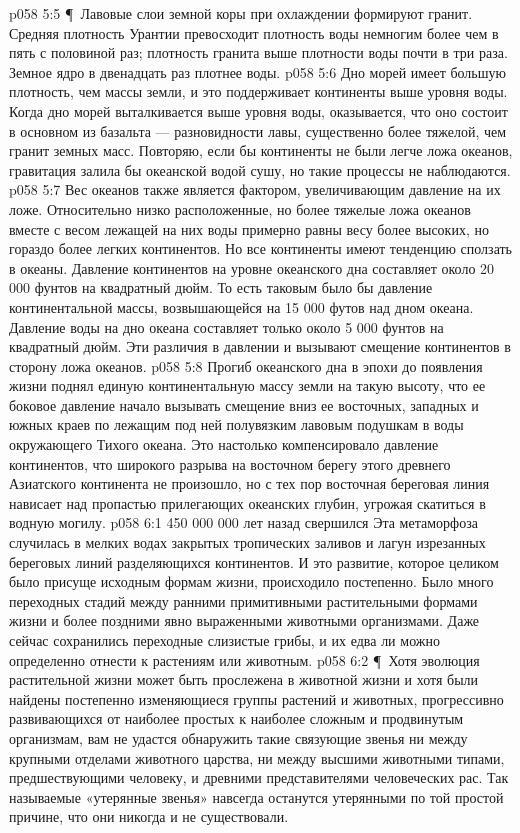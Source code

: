 \vs p058 5:5 \P\ Лавовые слои земной коры при охлаждении формируют гранит. Средняя плотность Урантии превосходит плотность воды немногим более чем в пять с половиной раз; плотность гранита выше плотности воды почти в три раза. Земное ядро в двенадцать раз плотнее воды.
\vs p058 5:6 Дно морей имеет большую плотность, чем массы земли, и это поддерживает континенты выше уровня воды. Когда дно морей выталкивается выше уровня воды, оказывается, что оно состоит в основном из базальта --- разновидности лавы, существенно более тяжелой, чем гранит земных масс. Повторяю, если бы континенты не были легче ложа океанов, гравитация залила бы океанской водой сушу, но такие процессы не наблюдаются.
\vs p058 5:7 Вес океанов также является фактором, увеличивающим давление на их ложе. Относительно низко расположенные, но более тяжелые ложа океанов вместе с весом лежащей на них воды примерно равны весу более высоких, но гораздо более легких континентов. Но все континенты имеют тенденцию сползать в океаны. Давление континентов на уровне океанского дна составляет около 20 000 фунтов на квадратный дюйм. То есть таковым было бы давление континентальной массы, возвышающейся на 15 000 футов над дном океана. Давление воды на дно океана составляет только около 5 000 фунтов на квадратный дюйм. Эти различия в давлении и вызывают смещение континентов в сторону ложа океанов.
\vs p058 5:8 Прогиб океанского дна в эпохи до появления жизни поднял единую континентальную массу земли на такую высоту, что ее боковое давление начало вызывать смещение вниз ее восточных, западных и южных краев по лежащим под ней полувязким лавовым подушкам в воды окружающего Тихого океана. Это настолько компенсировало давление континентов, что широкого разрыва на восточном берегу этого древнего Азиатского континента не произошло, но с тех пор восточная береговая линия нависает над пропастью прилегающих океанских глубин, угрожая скатиться в водную могилу.
\vs p058 6:1 450 000 000 лет назад свершился  Эта метаморфоза случилась в мелких водах закрытых тропических заливов и лагун изрезанных береговых линий разделяющихся континентов. И это развитие, которое целиком было присуще исходным формам жизни, происходило постепенно. Было много переходных стадий между ранними примитивными растительными формами жизни и более поздними явно выраженными животными организмами. Даже сейчас сохранились переходные слизистые грибы, и их едва ли можно определенно отнести к растениям или животным.
\vs p058 6:2 \P\ Хотя эволюция растительной жизни может быть прослежена в животной жизни и хотя были найдены постепенно изменяющиеся группы растений и животных, прогрессивно развивающихся от наиболее простых к наиболее сложным и продвинутым организмам, вам не удастся обнаружить такие связующие звенья ни между крупными отделами животного царства, ни между высшими животными типами, предшествующими человеку, и древними представителями человеческих рас. Так называемые «утерянные звенья» навсегда останутся утерянными по той простой причине, что они никогда и не существовали.
